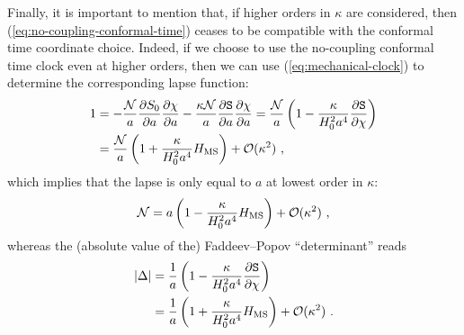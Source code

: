 \documentclass[12pt]{iopart}
\def\eq#1{\begin{equation}\begin{aligned}#1\end{aligned}\end{equation}}
\def\eref#1{(\ref{eq:#1})}
\def\del#1#2{\frac{\partial#1}{\partial#2}}
\def\S{\mathtt{S}}
\def\Ob{\mathcal{O}}
\def\N{\mathcal{N}}
\begin{document}
Finally, it is important to mention that, if higher orders in $\kappa$ are considered, then \eref{no-coupling-conformal-time} ceases to be compatible with the conformal time coordinate choice. Indeed, if we choose to use the no-coupling conformal time clock even at higher orders, then we can use \eref{mechanical-clock} to determine the corresponding lapse function:
\eq{
1 &=-\frac{\N}{a}\del{S_0}{a}\del{\chi}{a}-\frac{\kappa\N}{a}\del{\S}{a}\del{\chi}{a}=\frac{\N}{a}\left(1-\frac{\kappa}{H_0^2a^4}\del{\S}{\chi}\right)\\
&=\frac{\N}{a}\left(1+\frac{\kappa}{H_0^2a^4}H_{\rm MS}\right)+\Ob(\kappa^2) \ , 
}
which implies that the lapse is only equal to $a$ at lowest order in $\kappa$:
\eq{\label{eq:FPclassical}
\N = a\left(1-\frac{\kappa}{H_0^2a^4}H_{\rm MS}\right)+\Ob(\kappa^2) \ , 
}
whereas the (absolute value of the) Faddeev--Popov ``determinant'' reads
\eq{\label{eq:classical-FP}
|\Delta| &= \frac{1}{a}\left(1-\frac{\kappa}{H_0^2a^4}\del{\S}{\chi}\right)\\
&= \frac{1}{a}\left(1+\frac{\kappa}{H_0^2a^4}H_{\rm MS}\right)+\Ob(\kappa^2)\ .
}
\end{document}
